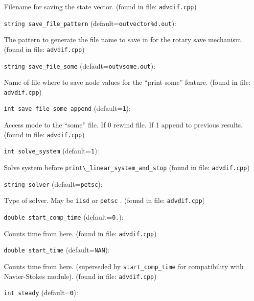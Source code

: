 Filename for saving the state vector.
 (found in file: \verb+advdif.cpp+)
\item\verb+string save_file_pattern+ {\rm(default=\verb|outvector%d.out|)}:

The pattern to generate the file name to save in for
the rotary save mechanism.
 (found in file: \verb+advdif.cpp+)
\item\verb+string save_file_some+ {\rm(default=\verb|outvsome.out|)}:

Name of file where to save node values for the ``print some'' 
feature. 
 (found in file: \verb+advdif.cpp+)
\item\verb+int save_file_some_append+ {\rm(default=\verb|1|)}:

Access mode to the ``some'' file. If 0 rewind file. If 1 
 append to previous  results.
 (found in file: \verb+advdif.cpp+)
\item\verb+int solve_system+ {\rm(default=\verb|1|)}:

Solve system before  \verb+print\_linear_system_and_stop+ 
 (found in file: \verb+advdif.cpp+)
\item\verb+string solver+ {\rm(default=\verb|petsc|)}:

Type of solver. May be  \verb+iisd+  or  \verb+petsc+ . 
 (found in file: \verb+advdif.cpp+)
\item\verb+double start_comp_time+ {\rm(default=\verb|0.|)}:

Counts time from here.
 (found in file: \verb+advdif.cpp+)
\item\verb+double start_time+ {\rm(default=\verb|NAN|)}:

Counts time from here. (superseded by
 \verb+start_comp_time+ for compatibility with Navier-Stokes
 module). 
 (found in file: \verb+advdif.cpp+)
\item\verb+int steady+ {\rm(default=\verb|0|)}:

